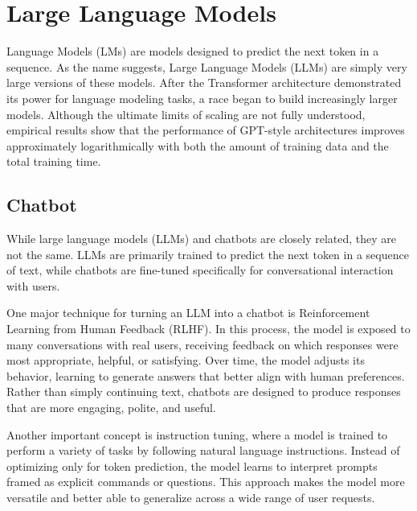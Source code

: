 \section{Large Language Models}

Language Models (LMs) are models designed to predict the next token in a sequence. As the name suggests, Large Language Models (LLMs) are simply very large versions of these models.
After the Transformer architecture demonstrated its power for language modeling tasks, a race began to build increasingly larger models. 
Although the ultimate limits of scaling are not fully understood, empirical results show that the performance of GPT-style architectures improves approximately logarithmically with both the amount of training data and the total training time.

\subsection{Chatbot}
While large language models (LLMs) and chatbots are closely related, they are not the same. 
LLMs are primarily trained to predict the next token in a sequence of text, while chatbots are fine-tuned specifically for conversational interaction with users.

One major technique for turning an LLM into a chatbot is Reinforcement Learning from Human Feedback (RLHF). 
In this process, the model is exposed to many conversations with real users, receiving feedback on which responses were most appropriate, helpful, or satisfying. 
Over time, the model adjusts its behavior, learning to generate answers that better align with human preferences. 
Rather than simply continuing text, chatbots are designed to produce responses that are more engaging, polite, and useful.

Another important concept is instruction tuning, where a model is trained to perform a variety of tasks by following natural language instructions. 
Instead of optimizing only for token prediction, the model learns to interpret prompts framed as explicit commands or questions. 
This approach makes the model more versatile and better able to generalize across a wide range of user requests.

